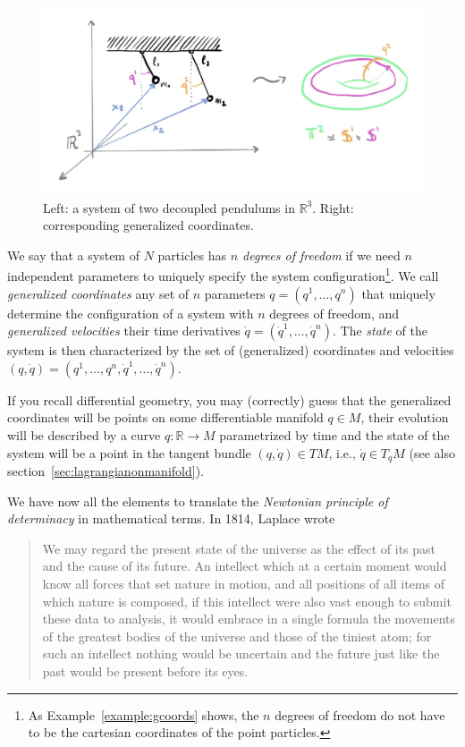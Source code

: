 \documentclass[english,fontsize=11pt,paper=b5]{scrbook}
\theoremstyle{definition}
\begin{document}
  \begin{figure}[ht!]
    \centering
    \includegraphics[width=0.9\linewidth,trim={0 1cm 0 1cm}, clip]{images/HM-1-1.pdf}
    \caption{Left: a system of two decoupled pendulums in $\mathbb{R}^3$. Right: corresponding generalized coordinates.}%
    \label{fig:twopend}
  \end{figure}

  We say that a system of $N$ particles has \emph{$n$ degrees of freedom} if we need $n$ independent parameters to uniquely specify the system configuration\footnote{As Example~\ref{example:gcoords} shows, the $n$ degrees of freedom do not have to be the cartesian coordinates of the point particles.}. We call \emph{generalized coordinates} any set of $n$ parameters $q = (q^1, \ldots, q^n)$ that uniquely determine the configuration of a system with $n$ degrees of freedom, and \emph{generalized velocities} their time derivatives $\dot q = (\dot q^1, \ldots, \dot q^n)$. The \emph{state} of the system is then characterized by the set of (generalized) coordinates and velocities $(q, \dot q) = \left(q^1, \ldots, q^n,\dot q^1, \ldots, \dot q^n\right)$.

  If you recall differential geometry, you may (correctly) guess that the generalized coordinates will be points on some differentiable manifold $q\in M$, their evolution will be described by a curve $q: \mathbb{R} \to M$ parametrized by time and the state of the system will be a point in the tangent bundle $(q, \dot q)\in TM$, i.e., $\dot q \in T_q M$ (see also section~\ref{sec:lagrangianonmanifold}).
  \medskip

  We have now all the elements to translate the \emph{Newtonian principle of determinacy} in mathematical terms.
  In 1814, Laplace \cite{book:laplace} wrote

  \begin{quotation}
    We may regard the present state of the universe as the effect of its past and the cause of its future. An intellect which at a certain moment would know all forces that set nature in motion, and all positions of all items of which nature is composed, if this intellect were also vast enough to submit these data to analysis, it would embrace in a single formula the movements of the greatest bodies of the universe and those of the tiniest atom; for such an intellect nothing would be uncertain and the future just like the past would be present before its eyes.
  \end{quotation}
\end{document}
